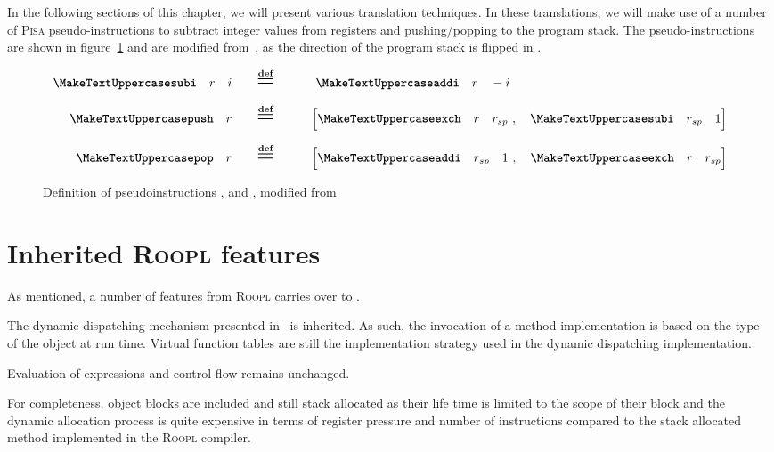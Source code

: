 In the following sections of this chapter, we will present various translation techniques. In these translations, we will make use of a number of \textsc{Pisa} pseudo-instructions to subtract integer values from registers and pushing/popping to the program stack. The pseudo-instructions are shown in figure~\ref{fig:pseudo-instructions} and are modified from~\cite{th:roopl}, as the direction of the program stack is flipped in \rooplpp.

\begin{figure}[ht]
    \centering
    \begin{alignat*}{2}
        \inst{subi}\quad r\quad i \qquad &\overset{\textbf{def}}{\scalebox{1.8}{=}} \qquad&&\ \inst{addi}\quad r\quad -i\\[1.6ex]
        \inst{push}\quad r \qquad &\overset{\textbf{def}}{\scalebox{1.8}{=}} \qquad&&\Big[\inst{exch}\quad r\quad r_{sp}\ , \quad \inst{subi}\quad r_{sp}\quad 1\Big]\\[1.6ex]
        \inst{pop}\quad r \qquad &\overset{\textbf{def}}{\scalebox{1.8}{=}} \qquad&&\Big[\inst{addi}\quad r_{sp}\quad 1\ , \quad \inst{exch}\quad r\quad r_{sp}\Big]
    \end{alignat*}
    \caption{Definition of pseudoinstructions ,  and , modified from~\cite{th:roopl}}
    \label{fig:pseudo-instructions}
\end{figure}


\section{Inherited \textsc{Roopl} features}
\label{sec:inherited-features}
As mentioned, a number of features from \textsc{Roopl} carries over to \rooplpp.

The dynamic dispatching mechanism presented in~\cite{th:roopl} is inherited. As such, the invocation of a method implementation is based on the type of the object at run time. Virtual function tables are still the implementation strategy used in the dynamic dispatching implementation.

Evaluation of expressions and control flow remains unchanged. 

For completeness, object blocks are included and still stack allocated as their life time is limited to the scope of their block and the dynamic allocation process is quite expensive in terms of register pressure and number of instructions compared to the stack allocated method implemented in the \textsc{Roopl} compiler.


